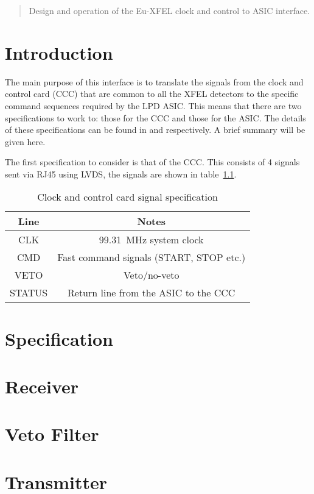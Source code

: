 \documentclass[12pt]{article}
\begin{document}
\maketitle

\begin{abstract}
	Design and operation of the Eu-XFEL clock and control to ASIC interface.
\end{abstract}

\chapter{Introduction} %
\label{cha:introduction}

The main purpose of this interface is to translate the signals from the clock and control card (CCC) that are common to all the XFEL detectors to the specific command sequences required by the LPD ASIC. This means that there are two specifications to work to: those for the CCC and those for the ASIC. The details of these specifications can be found in \cite{CCC SPEC CITATION} and \cite{ASIC SPEC CITATION} respectively. A brief summary will be given here.

The first specification to consider is that of the CCC. This consists of 4 signals sent via RJ45 using LVDS, the signals are shown in table~\ref{tab:ccc_spec}.

\begin{table}
	\begin{center}
	\begin{tabular}{c|c}
		Line & Notes \\
		\hline
		CLK    & 99.31~MHz system clock \\
		CMD    & Fast command signals (START, STOP etc.) \\
		VETO   & Veto/no-veto \\
		STATUS & Return line from the ASIC to the CCC \\
	\end{tabular}
	\end{center}
	\caption{Clock and control card signal specification}
	\label{tab:ccc_spec}
\end{table}

\chapter{Specification} %
\label{cha:specification}

\chapter{Receiver} %
\label{cha:receiver}

\chapter{Veto Filter} %
\label{cha:veto_filter}

\chapter{Transmitter} %
\label{cha:transmitter}



\end{document}
